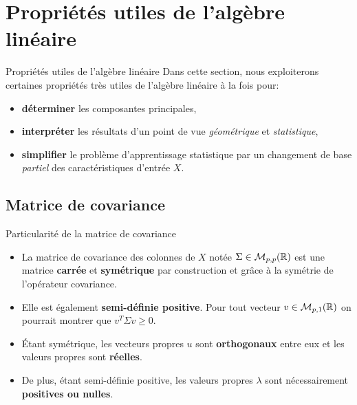 \section[Propriétés utiles de l'algèbre linéaire]{Propriétés utiles de l'algèbre linéaire}

\begin{frame}{Propriétés utiles de l'algèbre linéaire}
	Dans cette section, nous exploiterons certaines propriétés très utiles de l'algèbre linéaire à la fois pour:
	\begin{itemize}
		\item \textbf{déterminer} les composantes principales, 
		\item \textbf{interpréter} les résultats d'un point de vue \textit{géométrique} et \textit{statistique},
		\item \textbf{simplifier} le problème d'apprentissage statistique par un changement de base \textit{partiel} des caractéristiques d'entrée $X$.
	\end{itemize}
\end{frame}

\subsection[Matrice de covariance]{Matrice de covariance}

\begin{frame}{Particularité de la matrice de covariance}
	\begin{itemize}
		\item La matrice de covariance des colonnes de $X$ notée $\Sigma \in \mathcal{M}_{p,p}(\mathbb{R})$ est une matrice \textbf{carrée} et \textbf{symétrique} par construction et grâce à la symétrie de l'opérateur covariance.
		\pause
		\item Elle est également \textbf{semi-définie positive}. Pour tout vecteur $v \in \mathcal{M}_{p,1}(\mathbb{R})$ on pourrait montrer que $v^T \Sigma v \ge 0$.
		\pause
		\item \'Etant symétrique, les vecteurs propres $u$ sont \textbf{orthogonaux} entre eux et les valeurs propres sont \textbf{réelles}.
		\pause
		\item De plus, étant semi-définie positive, les valeurs propres $\lambda$ sont nécessairement \textbf{positives ou nulles}.
	\end{itemize}
\end{frame}

